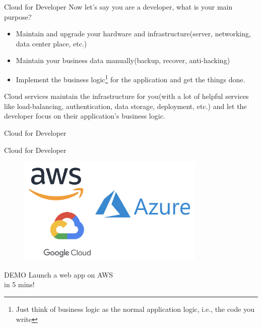 \documentclass[aspectratio=169, 12pt]{beamer}
\begin{document}
\begin{frame}{Cloud for Developer}
Now let's say you are a developer, what is your main purpose?
\begin{itemize}
\item {} Maintain and upgrade your hardware and infrastructure(server, networking, data center place, etc.)
\item {} Maintain your business data manually(backup, recover, anti-hacking)
\item {} Implement the business logic\footnote{\tiny Just think of business logic as the normal application logic, i.e., the code you write} for the application and get the things done.
\end{itemize}
\vfill
Cloud services maintain the infrastructure for you(with a lot of helpful services like load-balancing, authentication, data storage, deployment, etc.) and let the developer focus on their application's business logic.
\end{frame}

\begin{frame}{Cloud for Developer}
\centering
{}
\end{frame}

\begin{frame}{Cloud for Developer}
    \begin{figure}
        \centering
        \includegraphics[width=0.8\textwidth]{assets/cloud.png}
        \label{fig:cloud}
    \end{figure}
\end{frame}

\begin{frame}{DEMO}
\Huge Launch a web app on AWS 
\\\medskip
in 5 mins!
\end{frame}
\end{document}
